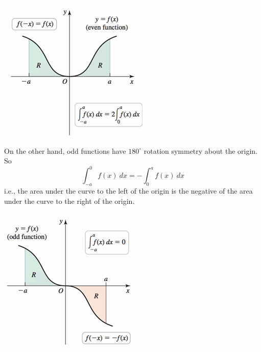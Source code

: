 \documentclass[cal1spr16Lectures.tex]{subfiles}
\begin{document}
\begin{frame}
\begin{center}
\includegraphics[scale=1]{pictures/Fig5_50a}
\end{center}
%
\end{frame}
%

\begin{frame}%
On the other hand, odd functions have $180^{\circ}$ rotation symmetry about the origin.  So
%
\[ 
\int_{-a}^0 f(x)\ dx = -\int_0^a f(x)\ dx
\]
%
i.e., the area under the curve to the left of the origin is the negative of the area under the curve to the right of the origin.
\end{frame}

\begin{frame}
\begin{center}
\includegraphics[scale=1]{pictures/Fig5_50b}
\end{center}
\end{frame}
\end{document}
